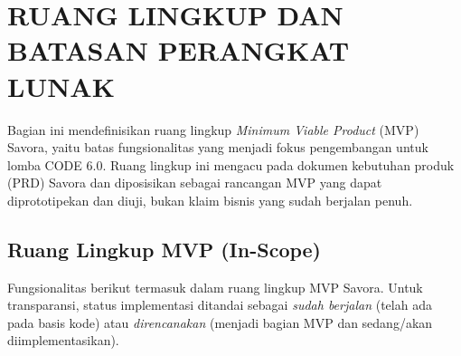 \section{RUANG LINGKUP DAN BATASAN PERANGKAT LUNAK}

Bagian ini mendefinisikan ruang lingkup \textit{Minimum Viable Product} (MVP) Savora, yaitu
batas fungsionalitas yang menjadi fokus pengembangan untuk lomba CODE 6.0. Ruang lingkup ini
mengacu pada dokumen kebutuhan produk (PRD) Savora dan diposisikan sebagai rancangan MVP yang
dapat diprototipekan dan diuji, bukan klaim bisnis yang sudah berjalan penuh.

\subsection{Ruang Lingkup MVP (In-Scope)}

Fungsionalitas berikut termasuk dalam ruang lingkup MVP Savora. Untuk transparansi, status
implementasi ditandai sebagai \emph{sudah berjalan} (telah ada pada basis kode) atau
\emph{direncanakan} (menjadi bagian MVP dan sedang/akan diimplementasikan).

